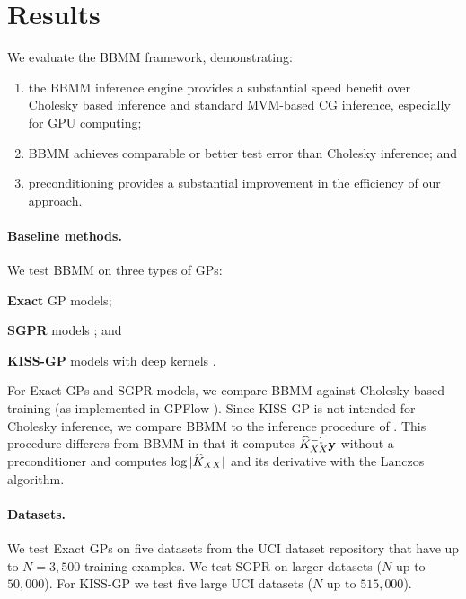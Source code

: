 \section{Results}
\label{sec:bbmm_results}

We evaluate the BBMM framework, demonstrating:
\begin{enumerate}
	\item the BBMM inference engine provides a substantial speed benefit over Cholesky based inference and standard MVM-based CG inference, especially for GPU computing;
	\item BBMM achieves comparable or better test error than Cholesky inference; and
	\item preconditioning provides a substantial improvement in the efficiency of our approach.
\end{enumerate}

\paragraph{Baseline methods.}
We test BBMM on three types of GPs:
\begin{enumerate*}
  \item {\bf Exact} GP models;
  \item {\bf SGPR} models \cite{titsias2009variational}; and
  \item {\bf KISS-GP} models with deep kernels \cite{wilson2015kernel,wilson2016deep}.
\end{enumerate*}
For Exact GPs and SGPR models, we compare BBMM against Cholesky-based training (as implemented in GPFlow \cite{matthews2017gpflow}).
Since KISS-GP is not intended for Cholesky inference, we compare BBMM to the inference procedure of \citet{dong2017scalable}.
This procedure differers from BBMM in that it computes $\widehat{K}_{XX}^{-1} \mathbf{y}$ without a preconditioner and computes $\log \vert \widehat{K}_{XX} \vert$ and its derivative with the Lanczos algorithm.

\paragraph{Datasets.}
We test Exact GPs on five datasets from the UCI dataset repository \cite{asuncion2007uci} that have up to $N=3,\!500$ training examples.
We test SGPR on larger datasets ($N$ up to $50,\!000$).
For KISS-GP we test five large UCI datasets ($N$ up to $515,\!000$).

